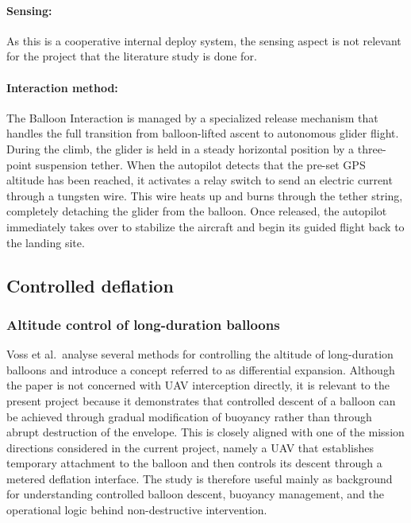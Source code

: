 \paragraph{Sensing:} As this is a cooperative internal deploy system, the sensing aspect is not relevant for the project that the literature study is done for.

\paragraph{Interaction method:} The Balloon Interaction is managed by a specialized release mechanism that handles the full transition from balloon-lifted ascent to autonomous glider flight. During the climb, the glider is held in a steady horizontal position by a three-point suspension tether. When the autopilot detects that the pre-set GPS altitude has been reached, it activates a relay switch to send an electric current through a tungsten wire. This wire heats up and burns through the tether string, completely detaching the glider from the balloon. Once released, the autopilot immediately takes over to stabilize the aircraft and begin its guided flight back to the landing site.




\subsection{ Controlled deflation}


\subsubsection{Altitude control of long-duration balloons}
Voss et al.\ analyse several methods for controlling the altitude of long-duration balloons and introduce a concept referred to as differential expansion. Although the paper is not concerned with UAV interception directly, it is relevant to the present project because it demonstrates that controlled descent of a balloon can be achieved through gradual modification of buoyancy rather than through abrupt destruction of the envelope. This is closely aligned with one of the mission directions considered in the current project, namely a UAV that establishes temporary attachment to the balloon and then controls its descent through a metered deflation interface. The study is therefore useful mainly as background for understanding controlled balloon descent, buoyancy management, and the operational logic behind non-destructive intervention. \cite{Voss2005AltitudeBalloons}

